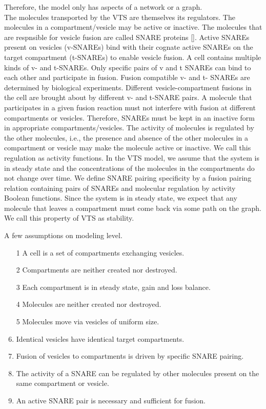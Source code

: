 

%
Therefore, the model only has aspects of a network or a graph.\\

The molecules transported by the VTS are themselves its regulators. The molecules in a
compartment/vesicle may be active or inactive. The molecules that are respnsible for vesicle fusion
are called SNARE proteins []. Active SNAREs present on vesicles (v-SNAREs) bind with their
cognate active SNAREs on the target compartment (t-SNAREs) to enable vesicle fusion. A cell
contains multiple kinds of v- and t-SNAREs. Only specific pairs of v and t SNAREs can bind to
each other and participate in fusion. Fusion compatible v- and t- SNAREs are determined by
biological experiments. Different vesicle-compartment fusions in the cell are brought about by
different v- and t-SNARE pairs. A molecule that participates in a given fusion reaction must not
interfere with fusion at different compartments or vesicles. Therefore, SNAREs must be kept in an
inactive form in appropriate compartments/vesicles. The activity of molecules is regulated by the
other molecules, i.e., the presence and absence of the other molecules in a compartment or vesicle
may make the molecule active or inactive. We call this regulation as activity functions.
In the VTS model, we assume that the system is in steady state and the concentrations of the
molecules in the compartments do not change over time. We define SNARE pairing specificity by a
fusion pairing relation containing pairs of SNAREs and molecular regulation by activity Boolean
functions. Since the system is in steady state, we expect that any molecule that leaves a
compartment must come back via some path on the graph. We call this property of VTS as stability.

A few assumptions on modeling level.
\begin{enumerate}
\item[1] A cell is a set of compartments exchanging vesicles.
\item[2] Compartments are neither created nor destroyed.
\item[3] Each compartment is in steady state, gain and loss balance.
\item[4] Molecules are neither created nor destroyed.
\item[5] Molecules move via vesicles of uniform size.
\item Identical vesicles have identical target compartments.
\item Fusion of vesicles to compartments is driven by specific SNARE pairing.
\item The activity of a SNARE can be regulated by other molecules present on the same compartment
or vesicle.
\item An active SNARE pair is necessary and sufficient for fusion. 
\end{enumerate}
 

